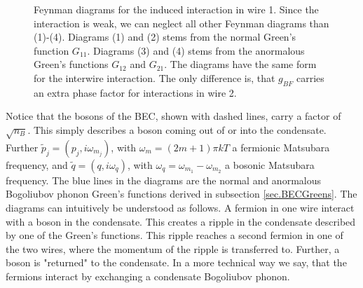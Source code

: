 \begin{figure}
\caption{Feynman diagrams for the induced interaction in wire 1. Since the interaction is weak, we can neglect all other Feynman diagrams than (1)-(4). Diagrams (1) and (2) stems from the normal Green's function $G_{11}$. Diagrams (3) and (4) stems from the anormalous Green's functions $G_{12}$ and $G_{21}$. The diagrams have the same form for the interwire interaction. The only difference is, that $g_{BF}$ carries an extra phase factor for interactions in wire 2. } 
\label{fig.feynmandiagrams}
\end{figure}

Notice that the bosons of the BEC, shown with dashed lines, carry a factor of $\sqrt{n_B}$. This simply describes a boson coming out of or into the condensate. Further $\tilde{p}_j = (p_j, i\omega_{m_j})$, with $\omega_{m} = (2m + 1)\pi kT$ a fermionic Matsubara frequency, and $\tilde{q} = (q, i\omega_q )$, with $\omega_q = \omega_{m_1} - \omega_{m_2}$ a bosonic Matsubara frequency. The blue lines in the diagrams are the normal and anormalous Bogoliubov phonon Green's functions derived in subsection \ref{sec.BECGreens}. The diagrams can intuitively be understood as follows. A fermion in one wire interact with a boson in the condensate. This creates a ripple in the condensate described by one of the Green's functions. This ripple reaches a second fermion in one of the two wires, where the momentum of the ripple is transferred to. Further, a boson is "returned" to the condensate. In a more technical way we say, that the fermions interact by exchanging a condensate Bogoliubov phonon.   

